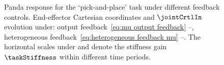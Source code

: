 \begin{figure}%
	\centering
	\hfil
	\caption{Panda response for the ‘pick-and-place’ task under different feedback controls. End-effector Cartesian coordinates and $\jointCrtlIn$ evolution under: output feedback~\cref{eq:mu output feedback} --,  heterogeneous feedback~\cref{eq:heterogeneous feedback mu} --. The horizontal scales under  and  denote the stiffness gain $\taskStiffness$ within different time periods.} %
\label{fig:pandaExperiment}
\end{figure}


